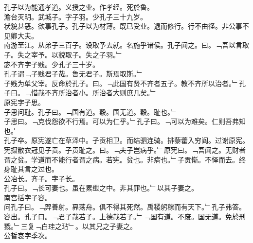 \documentclass{zhvt-classic}
\begin{document}
\hspace*{2em}孔子以为能通孝道。义授之业。作孝经。死於鲁。\\
\hspace*{2em}澹台灭明。武城子。字子羽。少孔子三十九岁。\\
\hspace*{2em}状貌甚恶。欲事孔子。孔子以为材薄。既已受业。退而修行。行不由径。非公事不见卿大夫。\\
\hspace*{2em}南游至江。从弟子三百子。设取予去就。名施乎诸侯。孔子闻之。曰。﹁吾以言取子。失之宰予。以貌取子。失之子羽。﹂\\
\hspace*{2em}宓不齐字子贱。少孔子三十岁。\\
\hspace*{2em}孔子谓﹁子贱君子哉。鲁无君子。斯焉取斯。﹂\\
\hspace*{2em}子贱为单父宰。反命於孔子。曰。﹁此国有贤不齐者五子。教不齐所以治者。﹂孔子曰。﹁惜哉不齐所治者小。所治者大则庶几矣。﹂\\
\hspace*{2em}原宪字子思。\\
\hspace*{2em}子思问耻。孔子曰。﹁国有道。穀。国无道。穀。耻也。﹂\\
\hspace*{2em}子思曰。﹁克伐怨欲不行焉。可以为仁乎。﹂孔子曰。﹁可以为难矣。仁则吾弗知也。﹂\\
\hspace*{2em}孔子卒。原宪遂亡在草泽中。子贡相卫。而结驷连骑。排藜藿入穷阎。过谢原宪。宪摄敝衣冠见子贡。子贡耻之。曰。﹁夫子岂病乎。﹂原宪曰。﹁吾闻之。无财者谓之贫。学道而不能行者谓之病。若宪。贫也。非病也。﹂子贡惭。不怿而去。终身耻其言之过也。\\
\hspace*{2em}公冶长。齐子。字子长。\\
\hspace*{2em}孔子曰。﹁长可妻也。虽在累绁之中。非其罪也。﹂以其子妻之。\\
\hspace*{2em}南宫括字子容。\\
\hspace*{2em}问孔子曰。﹁羿善射。奡荡舟。俱不得其死然。禹稷躬稼而有天下。﹂孔子弗答。容出。孔子曰。﹁君子哉若子。上德哉若子。﹂﹁国有道。不废。国无道。免於刑戮。﹂三复﹁白珪之玷﹂。以其兄之子妻之。\\
\hspace*{2em}公皙哀字季次。\\
\end{document}
